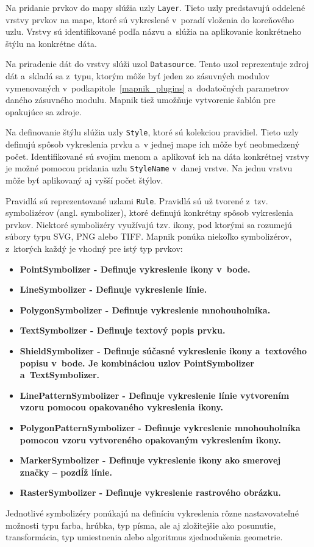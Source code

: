 Na pridanie prvkov do mapy slúžia uzly {\tt Layer}. Tieto uzly predstavujú oddelené vrstvy prvkov na mape, ktoré sú vykreslené v~poradí vloženia do koreňového uzlu. Vrstvy sú identifikované podľa názvu a~slúžia na aplikovanie konkrétneho štýlu na konkrétne dáta.

Na priradenie dát do vrstvy slúži uzol {\tt Datasource}. Tento uzol reprezentuje zdroj dát a~skladá sa z~typu, ktorým môže byť jeden zo zásuvných modulov vymenovaných v~podkapitole~\ref{mapnik_plugins} a~dodatočných parametrov daného zásuvného modulu. Mapnik tiež umožňuje vytvorenie šablón pre opakujúce sa zdroje.

Na definovanie štýlu slúžia uzly {\tt Style}, ktoré sú kolekciou pravidiel. Tieto uzly definujú spôsob vykreslenia prvku a~v jednej mape ich môže byť neobmedzený počet. Identifikované sú svojim menom a~aplikovať ich na dáta konkrétnej vrstvy je možné pomocou pridania uzlu {\tt StyleName} v~danej vrstve. Na jednu vrstvu môže byť aplikovaný aj vyšší počet štýlov.

Pravidlá sú reprezentované uzlami {\tt Rule}. Pravidlá sú už tvorené z~tzv. symbolizérov (angl. symbolizer), ktoré definujú konkrétny spôsob vykreslenia prvkov. Niektoré symbolizéry využívajú tzv. ikony, pod ktorými sa rozumejú súbory typu SVG, PNG alebo TIFF. Mapnik ponúka niekoľko symbolizérov, z~ktorých každý je vhodný pre istý typ prvkov:
\begin{itemize}
  \item{\bf PointSymbolizer \rm - Definuje vykreslenie ikony v~bode.}
  \item{\bf LineSymbolizer \rm - Definuje vykreslenie línie.}
  \item{\bf PolygonSymbolizer \rm - Definuje vykreslenie mnohouholníka.}
  \item{\bf TextSymbolizer \rm - Definuje textový popis prvku.}
  \item{\bf ShieldSymbolizer \rm - Definuje súčasné vykreslenie ikony a~textového popisu v~bode. Je kombináciou uzlov PointSymbolizer a~TextSymbolizer.}
  \item{\bf LinePatternSymbolizer \rm - Definuje vykreslenie línie vytvorením vzoru pomocou opakovaného vykreslenia ikony.}
  \item{\bf PolygonPatternSymbolizer \rm - Definuje vykreslenie mnohouholníka pomocou vzoru vytvoreného opakovaným vykreslením ikony.}
  \item{\bf MarkerSymbolizer \rm - Definuje vykreslenie ikony ako smerovej značky -- pozdĺž línie.}
  \item{\bf RasterSymbolizer \rm - Definuje vykreslenie rastrového obrázku.}
\end{itemize}
Jednotlivé symbolizéry ponúkajú na definíciu vykreslenia rôzne nastavovateľné možnosti typu farba, hrúbka, typ písma, ale aj zložitejšie ako posunutie, transformácia, typ umiestnenia alebo algoritmus zjednodušenia geometrie.

